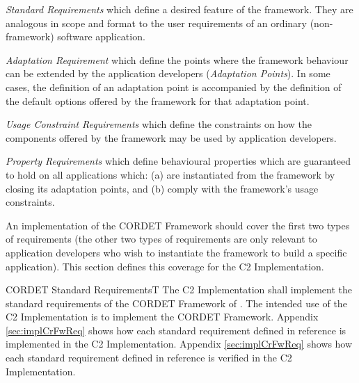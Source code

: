 \documentclass[a4paper,10pt]{article}
\newenvironment{fw_itemize}						%
{\begin{itemize}
  \setlength{\itemsep}{1mm}
  \setlength{\parskip}{0pt}
  \setlength{\parsep}{0pt}}
{\end{itemize}}
\newenvironment{fw_req}[6]
{\addtocounter{subsubsection}{1}
	\hspace{0.2cm}\textbf{CR-\arabic{section}.\arabic{subsection}.\arabic{subsubsection}/#2
	\hspace{0.8cm} #1}
	\vspace{-10pt}
\begin{longtable}{p{2.7cm}P{8.5cm}}
\hline
\textsc{Requirement} & #3 \\
\textsc{Justification} & #4 \\
\textsc{Implementation} & #5  \\ 
\textsc{Verification} & #6  \\
\hline
}
{\end{longtable}}
\begin{document}
\begin{fw_itemize}
\item{} \textit{Standard Requirements} which define a desired feature of the framework. They are analogous in scope and format to the user requirements of an ordinary (non-framework) software application.
\item{} \textit{Adaptation Requirement} which define the points where the framework behaviour can be extended by the application developers (\textit{Adaptation Points}). In some cases, the definition of an adaptation point is accompanied by the definition of the default options offered by the framework for that adaptation point.  
\item{} \textit{Usage Constraint Requirements} which define the constraints on how the components offered by the framework may be used by application developers.
\item{} \textit{Property Requirements} which define behavioural properties which are guaranteed to hold on all applications which: (a) are instantiated from the framework by closing its adaptation points, and (b) comply with the framework's usage constraints.
\end{fw_itemize}

An implementation of the CORDET Framework should cover the first two types of requirements (the other two types of requirements are only relevant to application developers who wish to instantiate the framework to build a specific application). This section defines this coverage for the C2 Implementation.

\begin{fw_req}{CORDET Standard Requirements}{T}
{The C2 Implementation shall implement the standard requirements of the CORDET Framework of \cite{ref:cordetfw}.}
{The intended use of the C2 Implementation is to implement the CORDET Framework.}
{Appendix \ref{sec:implCrFwReq} shows how each standard requirement defined in reference \cite{ref:cordetfw} is implemented in the C2 Implementation.} 
{Appendix \ref{sec:implCrFwReq} shows how each standard requirement defined in reference \cite{ref:cordetfw} is verified in the C2 Implementation.} 
\end{fw_req}
\end{document}
